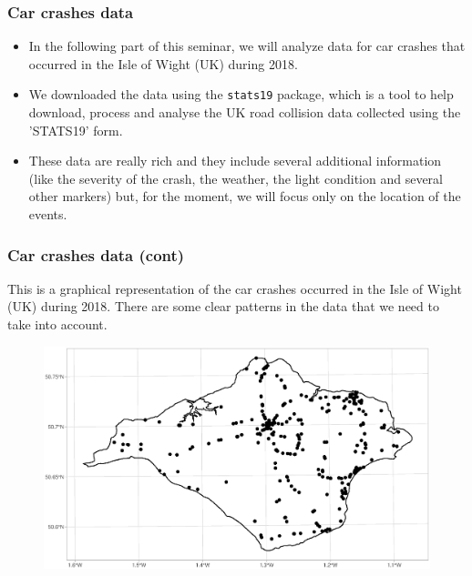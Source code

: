 \documentclass[c,10pt,pdftex]{beamer}
\begin{document}
\begin{frame}
\frametitle{Car crashes data}
\vspace{-0.75cm}
\begin{itemize}
	\setlength\itemsep{1em}
	\item In the following part of this seminar, we will analyze data for car crashes that occurred in the Isle of Wight (UK) during 2018. 
	
	\item We downloaded the data using the \texttt{stats19} package, which is a tool to help download, process and analyse the UK road collision data collected using the 'STATS19' form. 
	
	\item These data are really rich and they include several additional information (like the severity of the crash, the weather, the light condition and several other markers) but, for the moment, we will focus only on the location of the events. 
\end{itemize}
\end{frame}

\begin{frame}
\frametitle{Car crashes data (cont)}
\vspace{-0.25cm}
This is a graphical representation of the car crashes occurred in the Isle of Wight (UK) during 2018. There are some clear patterns in the data that we need to take into account.
\begin{figure}
	\centering
	\includegraphics[width=\linewidth]{images/iow_crashes}
\end{figure}
\end{frame}
\end{document}
